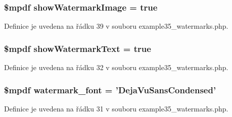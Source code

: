 \hypertarget{example35__watermarks_8php_a8fd349b8999c8096db1ed510167be7ee}{
\subsubsection[{show\-Watermark\-Image}]{\setlength{\rightskip}{0pt plus 5cm}\$mpdf show\-Watermark\-Image = true}}\label{example35__watermarks_8php_a8fd349b8999c8096db1ed510167be7ee}


Definice je uvedena na řádku 39 v souboru example35\-\_\-watermarks.\-php.

\hypertarget{example35__watermarks_8php_a9ab1c703a48a898b01dfcdf379ed52ce}{
\subsubsection[{show\-Watermark\-Text}]{\setlength{\rightskip}{0pt plus 5cm}\$mpdf show\-Watermark\-Text = true}}\label{example35__watermarks_8php_a9ab1c703a48a898b01dfcdf379ed52ce}


Definice je uvedena na řádku 32 v souboru example35\-\_\-watermarks.\-php.

\hypertarget{example35__watermarks_8php_a426580df42bc34f59a4fc5f8c28b717e}{
\subsubsection[{watermark\-\_\-font}]{\setlength{\rightskip}{0pt plus 5cm}\$mpdf watermark\-\_\-font = 'Deja\-Vu\-Sans\-Condensed'}}\label{example35__watermarks_8php_a426580df42bc34f59a4fc5f8c28b717e}


Definice je uvedena na řádku 31 v souboru example35\-\_\-watermarks.\-php.

